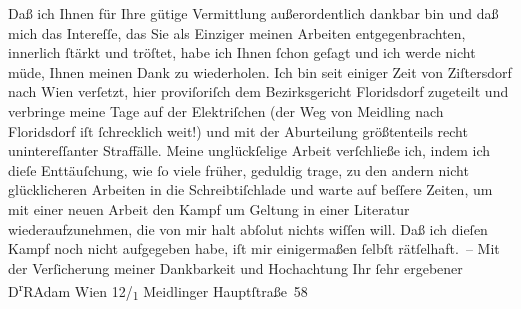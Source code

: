 \begin{ledgroupsized}[t]{13cm}
           \pstart
           Daß ich Ihnen für Ihre gütige Vermittlung außerordentlich dankbar bin und daß mich
               das {\pb}Intereſſe, das Sie als Einziger meinen Arbeiten
               entgegenbrachten, innerlich ſtärkt und tröſtet, habe ich Ihnen ſchon geſagt und ich
               werde nicht müde, Ihnen meinen Dank zu wiederholen.\pend
           \pstart
           Ich bin seit einiger Zeit von Ziſtersdorf nach
                  Wien verſetzt, hier proviſoriſch dem Bezirksgericht Floridsdorf zugeteilt und verbringe
               meine Tage auf der Elektriſchen (der Weg von Meidling nach Floridsdorf iſt ſchrecklich
               weit!) und mit der Aburteilung größtenteils recht unintereſſanter Straffälle.\pend
           \pstart
           Meine unglückſelige Arbeit verſchließe ich, indem ich dieſe Enttäuſchung, wie ſo
               viele früher, geduldig trage, zu den andern nicht glücklicheren Arbeiten in die
               Schreibtiſchlade und warte auf beſſere Zeiten, um mit einer neuen Arbeit den Kampf um
               Geltung in einer Literatur wiederaufzunehmen, die von mir halt abſolut nichts wiſſen
               will. Daß ich die{\pb}ſen Kampf noch nicht aufgegeben
               habe, iſt mir einigermaßen ſelbſt rätſelhaft. –\pend
           \pstart
           Mit der Verſicherung meiner Dankbarkeit und Hochachtung Ihr ſehr ergebener\pend
           \pstart \spacefill\mbox{D\textsuperscript{r}RAdam}\pend{}\pstart
           \noindent{}Wien 12/\textsubscript{1} Meidlinger
                     Hauptſtraße 58\pend
           
         
         \endnumbering{}\end{ledgroupsized}  \newcommand{\dateiname}{L02219}\newcommand{\titel}{Robert Adam an Arthur Schnitzler, 26. 9. 1915}\newcommand{\editorInnen}{Martin Anton Müller und Gerd-Hermann Susen}
      
